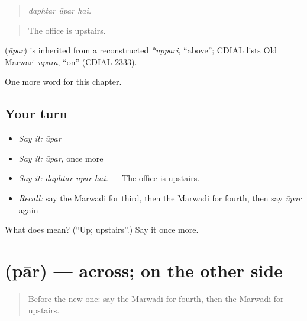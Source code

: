 \begin{quote}
  
\end{quote}

\begin{quote}
\emph{daphtar ūpar hai.}
\end{quote}

\begin{quote}
The office is upstairs.
\end{quote}

\begin{cousinweb}
\textbf{} (\emph{ūpar}) is inherited from a reconstructed \emph{*uppari}, \textquotedblleft{}above\textquotedblright{}; CDIAL lists Old Marwari \emph{ūpara}, \textquotedblleft{}on\textquotedblright{} (CDIAL 2333).
\end{cousinweb}

\begin{grammarlens}[title={What you've built}]
One more word for this chapter.
\end{grammarlens}

\subsection*{Your turn}
\begin{itemize}
\raggedright
  \item \emph{Say it:} \emph{ūpar}
  \item \emph{Say it:} \emph{ūpar}, once more
  \item \emph{Say it:} \emph{daphtar ūpar hai.} — The office is upstairs.
  \item \emph{Recall:} say the Marwadi for third, then the Marwadi for fourth, then say \emph{ūpar} again
\end{itemize}

\begin{tcolorbox}[breakable,colback=teal!4,colframe=teal!35!black,title={Before you move on}]
What does  mean? (\textquotedblleft{}Up; upstairs\textquotedblright{}.) Say it once more.
\end{tcolorbox}
\section[\texorpdfstring{\mw{पार} (pār)}{पार (pār)}]{ (pār) — across; on the other side}

\label{lesson:MW-C206-par}



\begin{quote}
Before the new one: say the Marwadi for fourth, then the Marwadi for upstairs.
\end{quote}

